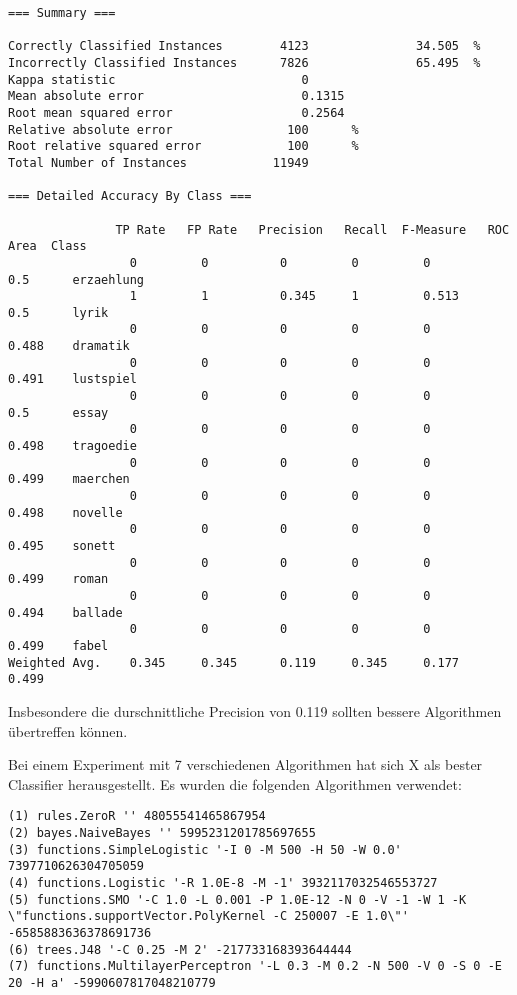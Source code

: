 \documentclass[]{article}
\begin{document}
\begin{verbatim}
=== Summary ===

Correctly Classified Instances        4123               34.505  %
Incorrectly Classified Instances      7826               65.495  %
Kappa statistic                          0     
Mean absolute error                      0.1315
Root mean squared error                  0.2564
Relative absolute error                100      %
Root relative squared error            100      %
Total Number of Instances            11949     

=== Detailed Accuracy By Class ===

               TP Rate   FP Rate   Precision   Recall  F-Measure   ROC Area  Class
                 0         0          0         0         0          0.5      erzaehlung
                 1         1          0.345     1         0.513      0.5      lyrik
                 0         0          0         0         0          0.488    dramatik
                 0         0          0         0         0          0.491    lustspiel
                 0         0          0         0         0          0.5      essay
                 0         0          0         0         0          0.498    tragoedie
                 0         0          0         0         0          0.499    maerchen
                 0         0          0         0         0          0.498    novelle
                 0         0          0         0         0          0.495    sonett
                 0         0          0         0         0          0.499    roman
                 0         0          0         0         0          0.494    ballade
                 0         0          0         0         0          0.499    fabel
Weighted Avg.    0.345     0.345      0.119     0.345     0.177      0.499
\end{verbatim}

Insbesondere die durschnittliche Precision von 0.119 sollten bessere
Algorithmen übertreffen können.

Bei einem Experiment mit 7 verschiedenen Algorithmen hat sich X als
bester Classifier herausgestellt. Es wurden die folgenden Algorithmen
verwendet:

\begin{verbatim}
(1) rules.ZeroR '' 48055541465867954
(2) bayes.NaiveBayes '' 5995231201785697655
(3) functions.SimpleLogistic '-I 0 -M 500 -H 50 -W 0.0' 7397710626304705059
(4) functions.Logistic '-R 1.0E-8 -M -1' 3932117032546553727
(5) functions.SMO '-C 1.0 -L 0.001 -P 1.0E-12 -N 0 -V -1 -W 1 -K \"functions.supportVector.PolyKernel -C 250007 -E 1.0\"' -6585883636378691736
(6) trees.J48 '-C 0.25 -M 2' -217733168393644444
(7) functions.MultilayerPerceptron '-L 0.3 -M 0.2 -N 500 -V 0 -S 0 -E 20 -H a' -5990607817048210779
\end{verbatim}
\end{document}
